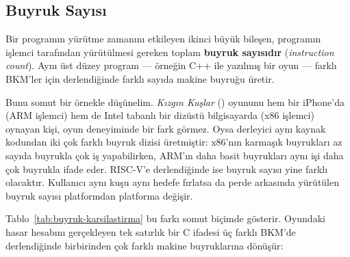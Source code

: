\subsection{Buyruk Sayısı}
\label{subsec:buyruk-sayisi}

Bir programın yürütme zamanını etkileyen ikinci büyük bileşen, programın işlemci tarafından yürütülmesi gereken toplam \textbf{buyruk sayısıdır} (\emph{instruction count}). Aynı üst düzey program --- örneğin C++ ile yazılmış bir oyun --- farklı BKM'ler için derlendiğinde farklı sayıda makine buyruğu üretir.

Bunu somut bir örnekle düşünelim. \emph{Kızgın Kuşlar} (\kizginkus) oyununu hem bir iPhone'da (ARM işlemci) hem de Intel tabanlı bir dizüstü bilgisayarda (x86 işlemci) oynayan kişi, oyun deneyiminde bir fark görmez. Oysa derleyici aynı kaynak kodundan iki çok farklı buyruk dizisi üretmiştir: x86'nın karmaşık buyrukları az sayıda buyrukla çok iş yapabilirken, ARM'ın daha basit buyrukları aynı işi daha çok buyrukla ifade eder. RISC-V\@'e derlendiğinde ise buyruk sayısı yine farklı olacaktır. Kullanıcı aynı kuşu aynı hedefe fırlatsa da perde arkasında yürütülen buyruk sayısı platformdan platforma değişir.

Tablo~\ref{tab:buyruk-karsilastirma} bu farkı somut biçimde gösterir. Oyundaki hasar hesabını gerçekleyen tek satırlık bir C ifadesi üç farklı BKM'de derlendiğinde birbirinden çok farklı makine buyruklarına dönüşür:

